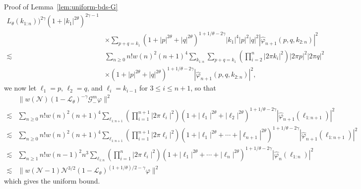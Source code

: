 \documentclass{article}
\newenvironment{proof*}[1]{\noindent\textbf{#1\ }}{\hspace*{\fill}$\Box$\medskip}
\begin{document}
\begin{proof*}{Proof of Lemma~\ref{lem:uniform-bds-G}}
\[\begin{array}{ll}
{       L_{\theta} (k_{1 : n}))^{2 \gamma}} (1 + | k_1 |^{2 \theta})^{2 \gamma
       - 1}\\
       & \times \sum_{p + q = k_1} (1 + | p |^{2 \theta} + | q |^{2
       \theta})^{1 + 1 / \theta - 2 \gamma} | k_1 |^4 | p |^2 | q |^2 |
       \hat{\varphi}_{n + 1} (p, q, k_{2 : n}) |^2\\
       \lesssim & \sum_{n \geqslant 0} n! w (n)^2 (n + 1)^4 \sum_{k_{1 : n}}
       \sum_{p + q = k_1} \left( \prod_{i = 2}^n | 2 \pi k_i |^2 \right) | 2
       \pi p |^2 | 2 \pi q |^2\\
       & \times (1 + | p |^{2 \theta} + | q |^{2 \theta})^{1 + 1 / \theta - 2
       \gamma} | \hat{\varphi}_{n + 1} (p, q, k_{2 : n}) |^2,
     \end{array} \]
  we now let $\ell_1 = p$, $\ell_2 = q$, and $\ell_i = k_{i - 1}$ for $3
  \leqslant i \leqslant n + 1$, so that
  \[ \begin{array}{ll}
       & \| w (\mathcal{N}) (1 -\mathcal{L}_{\theta})^{- \gamma}
       \mathcal{G}_-^m \varphi \|^2\\
       \lesssim & \sum_{n \geqslant 0} n! w (n)^2 (n + 1)^4 \sum_{\ell_{1 : n
       + 1}} \left( \prod_{i = 1}^{n + 1} | 2 \pi \ell_i |^2 \right) (1 + |
       \ell_1 |^{2 \theta} + | \ell_2 |^{2 \theta})^{1 + 1 / \theta - 2
       \gamma} | \hat{\varphi}_{n + 1} (\ell_{1 : n + 1}) |^2\\
       \lesssim & \sum_{n \geqslant 0} n! w (n)^2 (n + 1)^4 \sum_{\ell_{1 : n
       + 1}} \left( \prod_{i = 1}^{n + 1} | 2 \pi \ell_i |^2 \right) (1 + |
       \ell_1 |^{2 \theta} + \cdots + | \ell_{n + 1} |^{2 \theta})^{1 + 1 /
       \theta - 2 \gamma} | \hat{\varphi}_{n + 1} (\ell_{1 : n + 1}) |^2\\
       \lesssim & \sum_{n \geqslant 1} n! w (n - 1)^2 n^3 \sum_{\ell_{1 : n}}
       \left( \prod_{i = 1}^n | 2 \pi \ell_i |^2 \right) (1 + | \ell_1 |^{2
       \theta} + \cdots + | \ell_n |^{2 \theta})^{1 + 1 / \theta - 2 \gamma} |
       \hat{\varphi}_n (\ell_{1 : n}) |^2\\
       \lesssim & \| w (\mathcal{N}- 1) \mathcal{N}^{3 / 2} (1
       -\mathcal{L}_{\theta})^{(1 + 1 / \theta) / 2 - \gamma} \varphi \|^2
     \end{array} \]
  which gives the uniform bound.
  
  \
  

\end{proof*}
\end{document}
